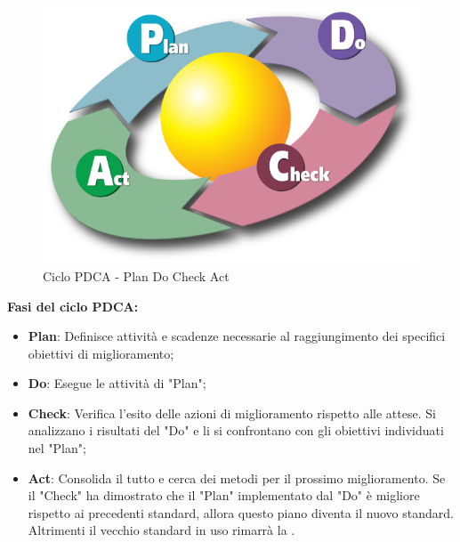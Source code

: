 \begin{figure}[h]
    \centering
    \includegraphics[scale=0.2]{Sezioni/Immagini/PDCA.png}
    \caption{Ciclo PDCA - Plan Do Check Act}
\end{figure}

\textbf{Fasi del ciclo PDCA:}
\begin{itemize}
    \item \textbf{Plan}: Definisce attività e scadenze necessarie al raggiungimento dei specifici obiettivi di miglioramento;
    \item \textbf{Do}: Esegue le attività di "Plan";
    \item \textbf{Check}: Verifica l'esito delle azioni di miglioramento rispetto alle attese. Si analizzano i risultati del "Do" e li si confrontano con gli obiettivi individuati nel "Plan";
    \item \textbf{Act}: Consolida il tutto e cerca dei metodi per il prossimo miglioramento. Se il "Check" ha dimostrato che il "Plan" implementato dal "Do" è migliore rispetto ai precedenti  standard, allora questo piano diventa il nuovo  standard. Altrimenti il vecchio standard in uso rimarrà la .
\end{itemize}